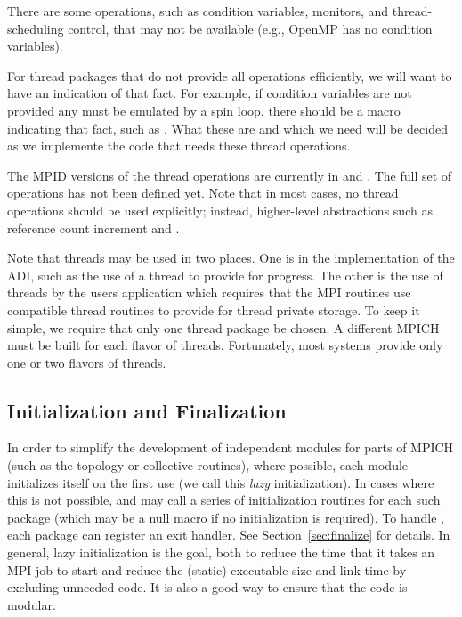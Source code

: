 \documentclass{article}
\begin{document}
There are some operations, such as condition variables, monitors, and
thread-scheduling control, that may not be available (e.g., OpenMP
has no condition variables).  

For thread packages that do not provide all operations efficiently, we
will want to have an indication of that fact.  For example, if
condition variables are not provided any must be emulated by a spin
loop, there should be a macro indicating that fact, such as
.  What these are and which we need
will be decided as we implemente the code that needs these thread
operations.

The MPID versions of the thread operations are currently in 
 and
.  The full set of operations has not
been defined yet.  Note that in most cases, no thread
operations should be used explicitly; instead, higher-level
abstractions such as reference count increment and
. 

Note that threads may be used in two places.  One is in the
implementation of the ADI, such as the use of a thread to provide for
progress.  The other is the use of threads by the users application
which requires that the MPI routines use compatible thread routines to
provide for thread private storage.  To keep it simple, we require
that only one thread package be chosen.  A different MPICH must be
built for each flavor of threads.  Fortunately, most systems provide
only one or two flavors of threads.

\subsection{Initialization and Finalization}
\label{sec:initialization}
In order to simplify the development of independent modules for parts
of MPICH (such as the topology or collective routines),  where
possible, each module initializes itself on the first use (we call
this \emph{lazy} initialization).  In cases
where this is not possible, 
 and  may call a series of
initialization routines for each such package (which may be a null
macro if no initialization is required).  To handle
, each package can register an exit handler.  See
Section~\ref{sec:finalize} for details.
In general, lazy initialization is the goal, both to reduce the time
that it takes an MPI job to start and reduce the (static) executable
size and link time by excluding unneeded code.  It is also a good way
to ensure that the code is modular.
\end{document}
